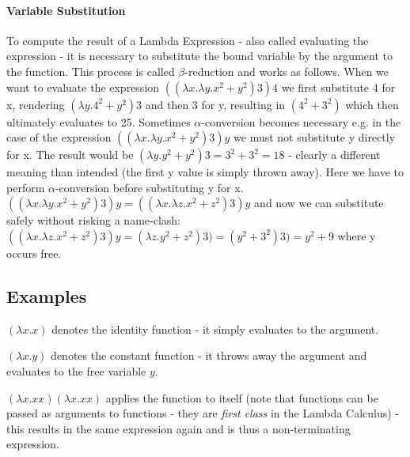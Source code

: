 \paragraph{Variable Substitution}
To compute the result of a Lambda Expression - also called evaluating the expression - it is necessary to substitute the bound variable by the argument to the function. This process is called $\beta$-reduction and works as follows. When we want to evaluate the expression $((\lambda x.\lambda y.x^2 + y^2) 3) 4$ we first substitute 4 for x, rendering $(\lambda y.4^2 + y^2) 3$ and then 3 for y, resulting in $(4^2 + 3^2)$ which then ultimately evaluates to 25. Sometimes $\alpha$-conversion becomes necessary e.g. in the case of the expression $((\lambda x.\lambda y.x^2 + y^2) 3) y$ we must not substitute y directly for x. The result would be $(\lambda y.y^2 + y^2) 3 = 3^2 + 3^2 = 18$ - clearly a different meaning than intended (the first y value is simply thrown away). Here we have to perform $\alpha$-conversion before substituting y for x. \\ 
$((\lambda x.\lambda y.x^2 + y^2) 3) y = ((\lambda x.\lambda z.x^2 + z^2) 3) y$ and now we can substitute safely without risking a name-clash: $((\lambda x.\lambda z.x^2 + z^2) 3) y = (\lambda z.y^2 + z^2) 3) = (y^2 + 3^2) 3) = y^2 + 9$ where y occurs free.

\subsection*{Examples}
$(\lambda x.x)$ denotes the identity function - it simply evaluates to the argument. 

\medskip

$(\lambda x.y)$ denotes the constant function - it throws away the argument and evaluates to the free variable $y$. 

\medskip

$(\lambda x.xx)(\lambda x.xx)$ applies the function to itself (note that functions can be passed as arguments to functions - they are \textit{first class} in the Lambda Calculus) - this results in the same expression again and is thus a non-terminating expression.

\medskip

